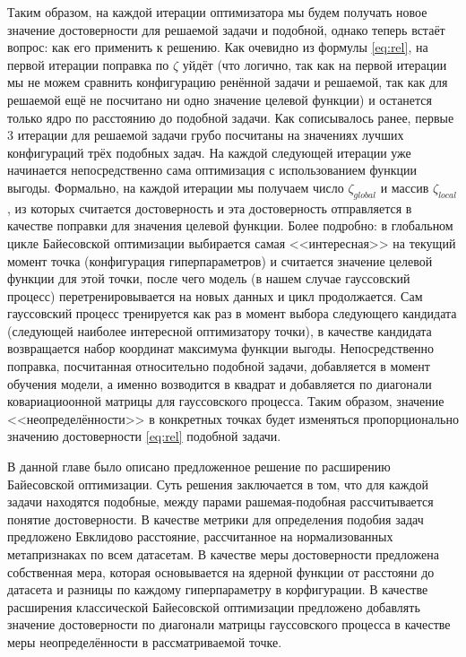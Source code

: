 \documentclass[times,specification,annotation]{itmo-student-thesis}
\begin{document}
	Таким образом, на каждой итерации оптимизатора мы будем получать новое значение достоверности для решаемой задачи и подобной, однако теперь встаёт вопрос: как его применить к решению. Как очевидно из формулы \ref{eq:rel}, на первой итерации поправка по $ \zeta$ уйдёт (что логично, так как на первой итерации мы не можем сравнить конфигурацию ренённой задачи и решаемой, так как для решаемой ещё не посчитано ни одно значение целевой функции) и останется только ядро по расстоянию до подобной задачи. Как сописывалось ранее, первые 3 итерации для решаемой задачи грубо посчитаны на значениях лучших конфигураций трёх подобных задач. На каждой следующей итерации уже начинается непосредственно сама оптимизация с использованием функции выгоды. Формально, на каждой итерации мы получаем число $ \zeta_{global} $ и массив $ \zeta_{local} $, из которых считается достоверность и эта достоверность отправляется в качестве поправки для значения целевой функции. Более подробно: в глобальном цикле Байесовской оптимизации выбирается самая <<интересная>> на текущий момент точка (конфигурация гиперпараметров) и считается значение целевой функции для этой точки, после чего модель (в нашем случае гауссовский процесс) перетренировывается на новых данных и цикл продолжается. Сам гауссовский процесс тренируется как раз в момент выбора следующего кандидата (следующей наиболее интересной оптимизатору точки), в качестве кандидата возвращается набор координат максимума функции выгоды. Непосредственно поправка, посчитанная относительно подобной задачи, добавляется в момент обучения модели, а именно возводится в квадрат и добавляется по диагонали ковариациоонной матрицы для гауссовского процесса. Таким образом, значение <<неопределённости>> в конкретных точках будет изменяться пропорционально значению достоверности \ref{eq:rel} подобной задачи.
	
	
	\chapterconclusion
	В данной главе было описано предложенное решение по расширению Байесовской оптимизации. Суть решения заключается в том, что для каждой задачи находятся подобные, между парами рашемая-подобная рассчитывается понятие достоверности. В качестве метрики для определения подобия задач предложено Евклидово расстояние, рассчитанное на нормализованных метапризнаках по всем датасетам. В качестве меры достоверности предложена собственная мера, которая основывается на ядерной функции от расстояни до датасета и разницы по каждому гиперпараметру в корфигурации. В качестве расширения классической Байесовской оптимизации предложено добавлять значение достоверности по диагонали матрицы гауссовского процесса в качестве меры неопределённости в рассматриваемой точке.
	
\end{document}
